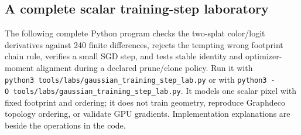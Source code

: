 \subsection{A complete scalar training-step laboratory}\label{04-visual-computing-ii-ch039-a-complete-scalar-training-step-laboratory}

The following complete Python program checks the two-splat color/logit derivatives against 240 finite differences, rejects the tempting wrong footprint chain rule, verifies a small SGD step, and tests stable identity and optimizer-moment alignment during a declared prune/clone policy. Run it with \texttt{python3\ tools/labs/gaussian\_training\_step\_lab.py} or with \texttt{python3\ -O\ tools/labs/gaussian\_training\_step\_lab.py}. It models one scalar pixel with fixed footprint and ordering; it does not train geometry, reproduce Graphdeco topology ordering, or validate GPU gradients. Implementation explanations are beside the operations in the code.

